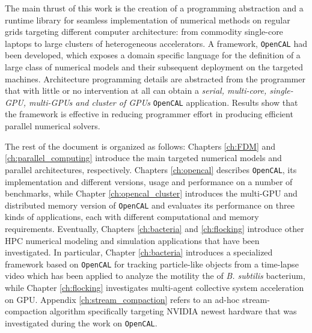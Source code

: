 The main thrust of this work is the creation of a programming abstraction and a runtime library for seamless implementation of numerical methods on regular grids targeting different computer architecture: from commodity single-core laptops to large clusters of heterogeneous accelerators. A framework, \texttt{OpenCAL} had been developed, which exposes a domain specific language for the definition of a large class of numerical models and their subsequent deployment on the targeted machines. Architecture programming details are abstracted from the programmer that with little or no intervention at all can obtain a \textit{serial, multi-core, single-GPU, multi-GPUs and cluster of GPUs} \texttt{OpenCAL} application. 
Results show that the framework is effective in reducing programmer effort in producing efficient parallel numerical solvers.

The rest of the document is organized as follows:
Chapters \ref{ch:FDM} and \ref{ch:parallel_computing} introduce the main targeted numerical models and parallel architectures, respectively.
Chapters \ref{ch:opencal}  describes \texttt{OpenCAL}, its implementation and different versions, usage and performance on a number of benchmarks, while Chapter \ref{ch:opencal_cluster} introduces the multi-GPU and distributed memory version of \texttt{OpenCAL} and evaluates its performance on three  kinds of applications, each with different computational and memory requirements.
Eventually, Chapters \ref{ch:bacteria} and  \ref{ch:flocking} introduce other HPC numerical modeling and simulation applications that have been investigated. 
In particular, Chapter \ref{ch:bacteria} introduces a specialized framework based on \texttt{OpenCAL} for tracking particle-like objects from a time-lapse video which has been applied to analyze the motility  the of \textit{B. subtilis} bacterium, while Chapter \ref{ch:flocking} investigates multi-agent collective system acceleration on GPU.
Appendix \ref{ch:stream_compaction} refers to an ad-hoc stream-compaction algorithm specifically targeting NVIDIA newest hardware that was investigated during the work on \texttt{OpenCAL}.
